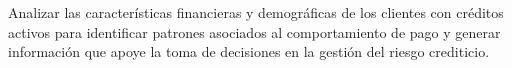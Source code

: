 Analizar las características financieras y demográficas de los clientes con créditos activos para identificar patrones asociados al comportamiento de pago y generar información que apoye la toma de decisiones en la gestión del riesgo crediticio.